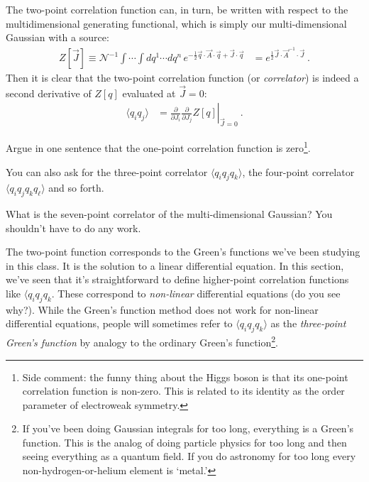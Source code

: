 The two-point correlation function can, in turn, be written with respect to the multidimensional generating functional, which is simply our multi-dimensional Gaussian with a source:
\begin{align}
	Z[\vec{J}]
	\equiv
	\mathcal N^{-1}
	\int\cdots\int dq^1\cdots dq^n \, e^{-\frac{1}{2} \vec{q}\cdot \vec{A}\cdot\vec{q} +\vec{J}\cdot\vec{q}}
	&=
	e^{\frac{1}{2}\vec{J}\cdot \vec{A}^{-1}\cdot\vec{J}} \ .
	\label{eq:Z:gaussian}
\end{align}
Then it is clear that the two-point correlation function (or \emph{correlator}) is indeed a second derivative of $Z[q]$ evaluated at $\vec{J}=0$:
\begin{align}
	\langle q_i q_j \rangle
	&=
	\left.
	\frac{\partial}{\partial J_i}
	\frac{\partial}{\partial J_j}
	Z[q]\right|_{\vec{J}=0} \ .
	\label{eq:correlator:J}
\end{align}
\begin{exercise}
Argue in one sentence that the one-point correlation function is zero\footnote{Side comment: the funny thing about the Higgs boson is that its one-point correlation function is non-zero. This is related to its identity as the order parameter of electroweak symmetry.}.
\end{exercise}
You can also ask for the three-point correlator $\langle q_i q_j q_k\rangle$, the four-point correlator $\langle q_i q_j q_k q_\ell\rangle$ and so forth.
\begin{exercise}
What is the seven-point correlator of the multi-dimensional Gaussian? You shouldn't have to do any work. 
\end{exercise}
\begin{example}
The two-point function corresponds to the Green's functions we've been studying in this class. It is the solution to a linear differential equation. In this section, we've seen that it's straightforward to define higher-point correlation functions like $\langle q_iq_jq_k$. These correspond to \emph{non-linear} differential equations (do you see why?). While the Green's function method does not work for non-linear differential equations, people will sometimes refer to $\langle q_iq_jq_k \rangle$ as the \emph{three-point Green's function} by analogy to the ordinary Green's function\footnote{If you've been doing Gaussian integrals for too long, everything is a Green's function. This is the analog of doing particle physics for too long and then seeing everything as a quantum field. If you do astronomy for too long every non-hydrogen-or-helium element is `metal.'}. 
\end{example}

